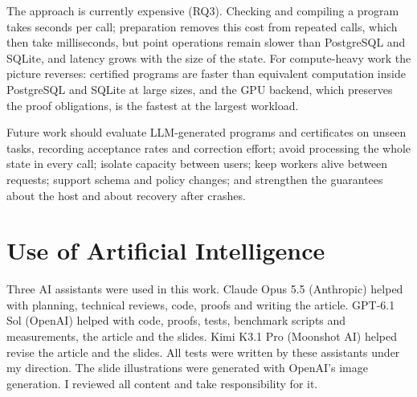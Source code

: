 \documentclass[12pt]{article}
\begin{document}
The approach is currently expensive (RQ3). Checking and compiling a program
takes seconds per call; preparation removes this cost from repeated calls, which
then take milliseconds, but point operations remain slower than PostgreSQL and
SQLite, and latency grows with the size of the state. For compute-heavy work
the picture reverses: certified programs are faster than equivalent computation
inside PostgreSQL and SQLite at large sizes, and the GPU backend, which
preserves the proof obligations, is the fastest at the largest workload.

Future work should evaluate LLM-generated programs and certificates on unseen
tasks, recording acceptance rates and correction effort; avoid processing the
whole state in every call; isolate capacity between users; keep workers alive
between requests; support schema and policy changes; and strengthen the
guarantees about the host and about recovery after crashes.

\section*{Use of Artificial Intelligence}
Three AI assistants were used in this work. Claude Opus 5.5 (Anthropic) helped
with planning, technical reviews, code, proofs and writing the article. GPT-6.1
Sol (OpenAI) helped with code, proofs, tests, benchmark scripts and
measurements, the article and the slides. Kimi K3.1 Pro (Moonshot AI) helped
revise the article and the slides. All tests were written by these assistants
under my direction. The slide illustrations were generated with
OpenAI's image generation. I reviewed all content and take responsibility for
it.



\end{document}
